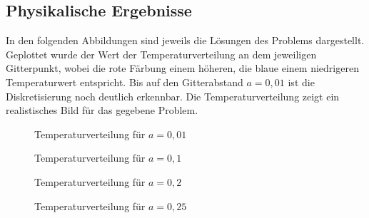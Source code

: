 \documentclass[10pt,a4paper]{article}
\begin{document}
\subsection{Physikalische Ergebnisse}
In den folgenden Abbildungen sind jeweils die Lösungen des Problems dargestellt. Geplottet wurde der Wert der Temperaturverteilung an dem jeweiligen Gitterpunkt, wobei die rote Färbung einem höheren, die blaue einem niedrigeren Temperaturwert entspricht. Bis auf den Gitterabstand $a=0,01$ ist die Diskretisierung noch deutlich erkennbar.
Die Temperaturverteilung zeigt ein realistisches Bild für das gegebene Problem.

\begin{figure}[htbp!]
\begin{minipage}[c]{0.5\textwidth}
\centering
\vspace{-60pt}
\scalebox{0.9}{}
\vspace{-40pt}
\caption{Temperaturverteilung für $a=0,01$}
\label{fig:a_1}
\vspace{-20pt}
\scalebox{0.9}{}
\vspace{-40pt}
\caption{Temperaturverteilung für $a=0,1$}
\label{fig:a_10}
\end{minipage}
\begin{minipage}[c]{0.5\textwidth}
\centering
\vspace{-60pt}
\scalebox{0.9}{}
\vspace{-40pt}
\caption{Temperaturverteilung für $a=0,2$}
\label{fig:a_20}
\vspace{-20pt}
\scalebox{0.9}{}
\vspace{-40pt}
\caption{Temperaturverteilung für $a=0,25$}
\label{fig:a_25}
\end{minipage}
\end{figure}

%
%
%
%
\end{document}
